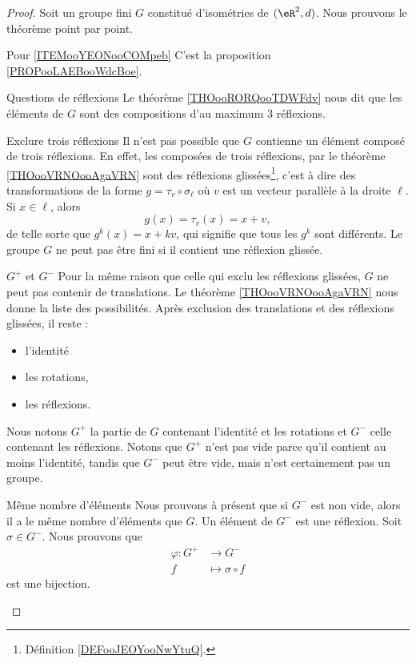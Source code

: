 \begin{proof}
    Soit un groupe fini \( G\) constitué d'isométries de \( (\eR^2,d)\). Nous prouvons le théorème point par point.
    \begin{subproof}
        \item[Pour \ref{ITEMooYEONooCOMpeb}]
            C'est la proposition \ref{PROPooLAEBooWdcBoe}.
        \item[Questions de réflexions]
            Le théorème \ref{THOooRORQooTDWFdv} nous dit que les éléments de \( G\) sont des compositions d'au maximum \( 3\) réflexions. 
        \item[Exclure trois réflexions]
            Il n'est pas possible que \( G\) contienne un élément composé de trois réflexions. En effet, les composées de trois réflexions, par le théorème \ref{THOooVRNOooAgaVRN} sont des réflexions glissées\footnote{Définition \ref{DEFooJEOYooNwYtuQ}.}, c'est à dire des transformations de la forme \( g=\tau_v\circ \sigma_{\ell}\) où \( v\) est un vecteur parallèle à la droite \( \ell\). Si \( x\in \ell\), alors
            \begin{equation}
                g(x)=\tau_v(x)=x+v,
            \end{equation}
            de telle sorte que \( g^k(x)=x+kv\), qui signifie que tous les \( g^k\) sont différents. Le groupe \( G\) ne peut pas être fini si il contient une réflexion glissée.

        \item[\( G^+\) et \( G^-\)]
            Pour la même raison que celle qui exclu les réflexions glissées, \( G\) ne peut pas contenir de translations. Le théorème \ref{THOooVRNOooAgaVRN} nous donne la liste des possibilités. Après exclusion des translations et des réflexions glissées, il reste :
            \begin{itemize}
                \item l'identité
                \item les rotations,
                \item les réflexions.
            \end{itemize}
            Nous notons \( G^+\) la partie de \( G\) contenant l'identité et les rotations et \( G^-\) celle contenant les réflexions. Notons que \( G^+\) n'est pas vide parce qu'il contient au moins l'identité, tandis que \( G^-\) peut être vide, mais n'est certainement pas un groupe.
        \item[Même nombre d'éléments]
            Nous prouvons à présent que si \( G^-\) est non vide, alors il a le même nombre d'éléments que \( G\). Un élément de \( G^-\) est une réflexion. Soit \( \sigma\in G^-\). Nous prouvons que
            \begin{equation}        \label{EQooWRVVooBQCtPg}
                \begin{aligned}
                    \varphi\colon G^+&\to G^- \\
                    f&\mapsto \sigma\circ f 
                \end{aligned}
            \end{equation}
            est une bijection.


\end{subproof}
\end{proof}

